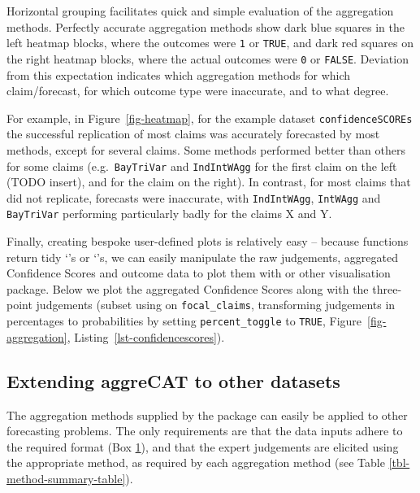 \documentclass[article]{jss}
\newcommand{\class}[1]{`\code{#1}'}
\newcommand{\fct}[1]{\code{#1()}}
\begin{document}
Horizontal grouping facilitates quick and simple evaluation of the
aggregation methods. Perfectly accurate aggregation methods show dark
blue squares in the left heatmap blocks, where the outcomes were
\texttt{1} or \texttt{TRUE}, and dark red squares on the right heatmap
blocks, where the actual outcomes were \texttt{0} or \texttt{FALSE}.
Deviation from this expectation indicates which aggregation methods for
which claim/forecast, for which outcome type were inaccurate, and to
what degree.

For example, in Figure~\ref{fig-heatmap}, for the example dataset
\texttt{confidenceSCOREs} the successful replication of most claims was
accurately forecasted by most methods, except for several claims. Some
methods performed better than others for some claims
(e.g.~\texttt{BayTriVar} and \texttt{IndIntWAgg} for the first claim on
the left (TODO insert), and for the claim on the right). In contrast,
for most claims that did not replicate, forecasts were inaccurate, with
\texttt{IndIntWAgg}, \texttt{IntWAgg} and \texttt{BayTriVar} performing
particularly badly for the claims X and Y.

Finally, creating bespoke user-defined plots is relatively easy --
because  functions return tidy \class{data.frame}s or
\class{tibble}s, we can easily manipulate the raw judgements, aggregated
Confidence Scores and outcome data to plot them with 
\citep{ggplot2016} or other visualisation package. Below we plot the
aggregated Confidence Scores along with the three-point judgements
(subset using \fct{preprocess_judgements} on \texttt{focal\_claims},
transforming judgements in percentages to probabilities by setting
\texttt{percent\_toggle} to \texttt{TRUE}, Figure~\ref{fig-aggregation},
Listing~\ref{lst-confidencescores}).

\hypertarget{extending-aggrecat-to-other-datasets}{%
\subsection{Extending aggreCAT to other
datasets}\label{extending-aggrecat-to-other-datasets}}

The aggregation methods supplied by the  package can
easily be applied to other forecasting problems. The only requirements
are that the data inputs adhere to the required format (Box
\protect\hyperlink{aggWorkflow}{1}), and that the expert judgements are
elicited using the appropriate method, as required by each aggregation
method (see Table \ref{tbl-method-summary-table}).
\end{document}
